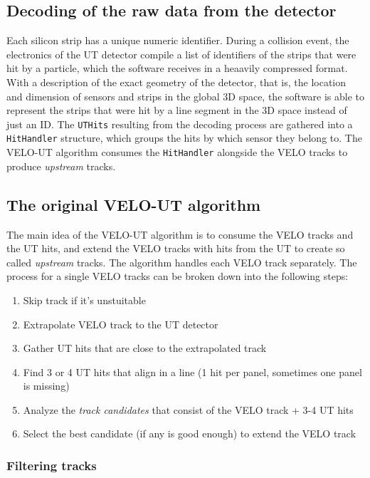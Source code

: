 \documentclass[12pt]{article}
\newcommand{\code}[1]{\texttt{#1}}
\begin{document}
\subsection{Decoding of the raw data from the detector}

Each silicon strip has a unique numeric identifier. During a collision event, the electronics of the UT detector compile a list of identifiers of the strips that were hit by a particle, which the software receives in a heaavily compressed format. With a description of the exact geometry of the detector, that is, the location and dimension of sensors and strips in the global 3D space, the software is able to represent the strips that were hit by a line segment in the 3D space instead of just an ID. The \code{UTHits} resulting from the  decoding process are gathered into a \code{HitHandler} structure, which groups the hits by which sensor they belong to. The VELO-UT algorithm consumes the \code{HitHandler} alongside the VELO tracks to produce \textit{upstream} tracks.


\subsection{The original VELO-UT algorithm}\label{sec_velout_desc}

The main idea of the VELO-UT algorithm is to consume the VELO tracks and the UT hits, and extend the VELO tracks with hits from the UT to create so called \textit{upstream} tracks. The algorithm handles each VELO track separately. The process for a single VELO tracks can be broken down into the following steps:

\begin{enumerate}
	\item Skip track if it's unstuitable
	\item Extrapolate VELO track to the UT detector
	\item Gather UT hits that are close to the extrapolated track
	\item Find 3 or 4 UT hits that align in a line (1 hit per panel, sometimes one panel is missing)
	\item Analyze the \textit{track candidates} that consist of the VELO track + 3-4 UT hits
	\item Select the best candidate (if any is good enough) to extend the VELO track
\end{enumerate}


\subsubsection{Filtering tracks}
\end{document}

